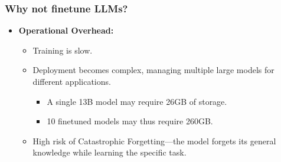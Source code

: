 \documentclass[24pt]{beamer}
\begin{document}
    \begin{frame}
    	\frametitle{Why not finetune LLMs?}
    	\begin{itemize}
    		\item \textbf{Operational Overhead:}
    		\begin{itemize}
    			\item Training is \alert{slow}. 
    			\item Deployment becomes complex,
    			managing \alert{multiple large models} for different applications.
    			\begin{itemize}
    				\item A single 13B model may require 26GB of storage.
    				\item 10 finetuned models may thus require 260GB.
    			\end{itemize}
    			\item High risk of \alert{Catastrophic Forgetting}---the model forgets
    			its general knowledge while learning the specific task.
    		\end{itemize}
    	\end{itemize}
    	
    \end{frame}
    
\end{document}
